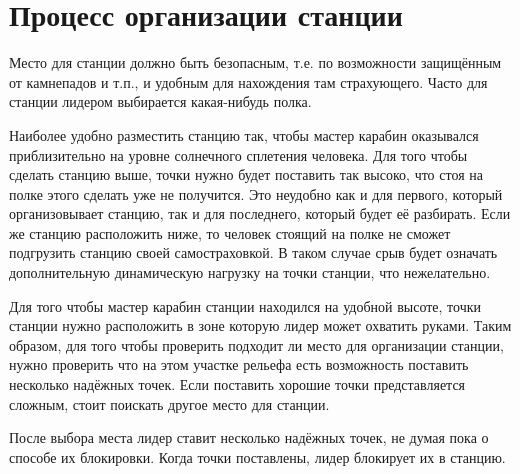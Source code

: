 \documentclass[fleqn, 12pt]{extarticle}
\begin{document}
\section{Процесс организации станции}
    Место для станции должно быть безопасным, т.е. по возможности защищённым от камнепадов и т.п., и удобным для нахождения там страхующего. Часто для станции лидером выбирается
    какая-нибудь полка.
    
    Наиболее удобно разместить станцию так, чтобы мастер карабин оказывался приблизительно на уровне солнечного сплетения человека. Для того чтобы сделать
    станцию выше, точки нужно будет поставить так высоко, что стоя на полке этого сделать уже не получится. Это неудобно как и для первого, который организовывает станцию,
    так и для последнего, который будет её разбирать. Если же станцию расположить ниже, то человек стоящий на полке не сможет подгрузить станцию своей самостраховкой.
    В таком случае срыв будет означать дополнительную динамическую нагрузку на точки станции, что нежелательно.
    
    Для того чтобы мастер карабин станции находился на удобной высоте, точки станции нужно расположить в зоне которую лидер может охватить руками. Таким образом,
    для того чтобы проверить подходит ли место для организации станции, нужно проверить что на этом участке рельефа есть возможность поставить несколько надёжных точек.
    Если поставить хорошие точки представляется сложным, стоит поискать другое место для станции.

    После выбора места лидер ставит несколько надёжных точек, не думая пока о способе их блокировки. Когда точки поставлены, лидер блокирует их в станцию.
\end{document}
